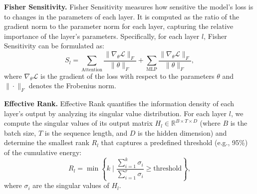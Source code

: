 \documentclass[11pt]{article}
\begin{document}
\textbf{Fisher Sensitivity.} Fisher Sensitivity measures how sensitive the model's loss is to changes in the parameters of each layer. It is computed as the ratio of the gradient norm to the parameter norm for each layer, capturing the relative importance of the layer's parameters. Specifically, for each layer \(l\), Fisher Sensitivity can be formulated as:
\begin{equation}
S_l = \sum_{\text{Attention}} \frac{\|\nabla_{\theta} \mathcal{L}\|_F}{\|\theta\|_F} + \sum_{\text{MLP}} \frac{\|\nabla_{\theta} \mathcal{L}\|_F}{\|\theta\|_F},
\end{equation}
where \(\nabla_{\theta} \mathcal{L}\) is the gradient of the loss with respect to the parameters \(\theta\) and \(\|\cdot\|_F\) denotes the Frobenius norm.

\textbf{Effective Rank.} Effective Rank quantifies the information density of each layer's output by analyzing its singular value distribution. For each layer \(l\), we compute the singular values of its output matrix \(H_l \in \mathbb{R}^{B \times T \times D}\) (where \(B\) is the batch size, \(T\) is the sequence length, and \(D\) is the hidden dimension) and determine the smallest rank \(R_l\) that captures a predefined threshold (e.g., 95\%) of the cumulative energy:
\begin{equation}
R_l = \min\left\{k \mid \frac{\sum_{i=1}^k \sigma_i}{\sum_{i=1}^r \sigma_i} \geq \text{threshold}\right\},
\end{equation}
where \(\sigma_i\) are the singular values of \(H_l\).



\end{document}

